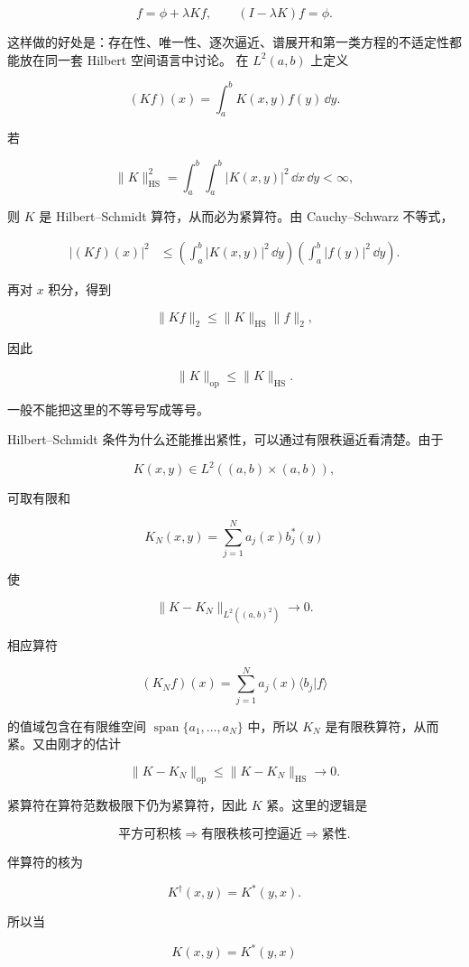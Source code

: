 \[
f=\phi+\lambda Kf,
\qquad
(I-\lambda K)f=\phi.
\]

这样做的好处是：存在性、唯一性、逐次逼近、谱展开和第一类方程的不适定性都能放在同一套 Hilbert 空间语言中讨论。
在 $L^2(a,b)$ 上定义

\[
(Kf)(x)=\int_a^b K(x,y)f(y)\,\dd y.
\]

若

\[
\|K\|_{\mathrm{HS}}^2
=\int_a^b\int_a^b|K(x,y)|^2\,\dd x\,\dd y<\infty,
\]

则 $K$ 是 Hilbert--Schmidt 算符，从而必为紧算符。由 Cauchy--Schwarz 不等式，

\[
\begin{aligned}
|(Kf)(x)|^2
&\le \left(\int_a^b|K(x,y)|^2\,\dd y\right)
\left(\int_a^b|f(y)|^2\,\dd y\right).
\end{aligned}
\]

再对 $x$ 积分，得到

\[
\|Kf\|_2\le \|K\|_{\mathrm{HS}}\|f\|_2,
\]

因此

\[
{\|K\|_{\mathrm{op}}\le\|K\|_{\mathrm{HS}}}.
\]

一般不能把这里的不等号写成等号。

Hilbert--Schmidt 条件为什么还能推出紧性，可以通过有限秩逼近看清楚。由于

\[
K(x,y)\in L^2((a,b)\times(a,b)),
\]

可取有限和

\[
K_N(x,y)=\sum_{j=1}^{N}a_j(x)b_j^*(y)
\]

使

\[
\|K-K_N\|_{L^2((a,b)^2)}\to0.
\]

相应算符

\[
(K_Nf)(x)
=\sum_{j=1}^{N}a_j(x)\langle b_j|f\rangle
\]

的值域包含在有限维空间 $\operatorname{span}\{a_1,\ldots,a_N\}$ 中，所以 $K_N$ 是有限秩算符，从而紧。又由刚才的估计

\[
\|K-K_N\|_{\mathrm{op}}
\le\|K-K_N\|_{\mathrm{HS}}\to0.
\]

紧算符在算符范数极限下仍为紧算符，因此 $K$ 紧。这里的逻辑是

\[
\text{平方可积核}
\Rightarrow\text{有限秩核可控逼近}
\Rightarrow\text{紧性}.
\]

伴算符的核为

\[
K^\dagger(x,y)=K^*(y,x).
\]

所以当

\[
K(x,y)=K^*(y,x)
\]

